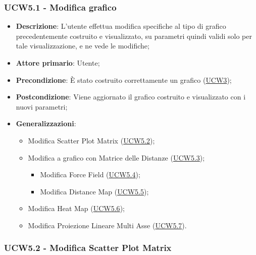 \newpage
\subsubsection{UCW5.1 - Modifica grafico}
\label{ssub:ucw5.1}

\begin{itemize}
    \item \textbf{Descrizione}: L’utente effettua modifica specifiche al tipo di grafico precedentemente costruito e visualizzato,
          su parametri quindi validi solo per tale visualizzazione, e ne vede le modifiche;

    \item \textbf{Attore primario}: Utente;

    \item \textbf{Precondizione}:   È stato costruito correttamente un grafico (\hyperref[sub:ucw3]{UCW3});

    \item \textbf{Postcondizione}:  Viene aggiornato il grafico costruito e visualizzato con i nuovi parametri;

    \item \textbf{Generalizzazioni}:
          \begin{itemize}
              \item Modifica Scatter Plot Matrix (\hyperref[ssub:ucw5.2]{UCW5.2});
              \item Modifica a grafico con Matrice delle Distanze (\hyperref[ssub:ucw5.3]{UCW5.3});
                    \begin{itemize}
                        \item Modifica Force Field (\hyperref[ssub:ucw5.4]{UCW5.4});
                        \item Modifica Distance Map (\hyperref[ssub:ucw5.5]{UCW5.5});
                    \end{itemize}
              \item Modifica Heat Map (\hyperref[ssub:ucw5.6]{UCW5.6});
              \item Modifica Proiezione Lineare Multi Asse (\hyperref[ssub:ucw5.7]{UCW5.7}).
          \end{itemize}
\end{itemize}

\subsubsection{UCW5.2 - Modifica Scatter Plot Matrix}
\label{ssub:ucw5.2}

